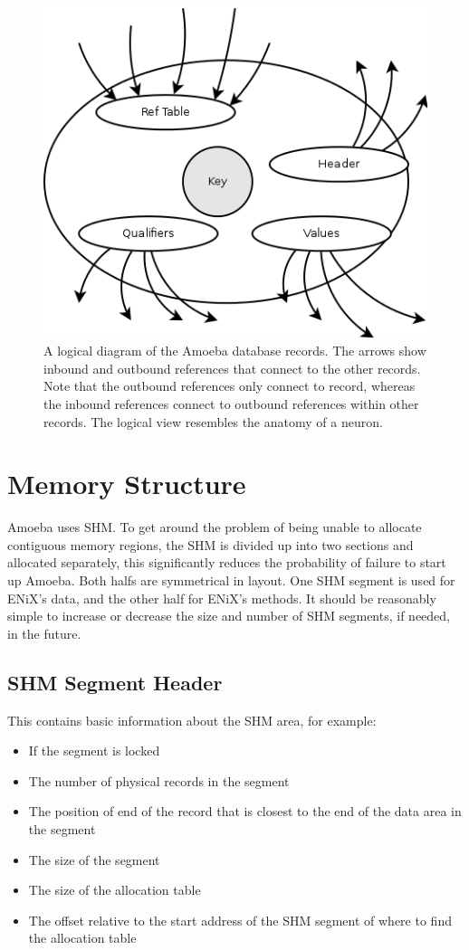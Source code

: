 \documentclass[11pt]{article}
\begin{document}
\begin{figure}[ht]
\centering
\includegraphics[scale=0.4]{AmoebaRecordStructure2.png}
\caption{A logical diagram of the Amoeba database records. The arrows show inbound and outbound references that connect to the other records. Note that the outbound references only connect to record, whereas the inbound references connect to outbound references within other records. The logical view resembles the anatomy of a neuron.}
\end{figure}
\newpage
\noindent
\section{Memory Structure}
Amoeba uses SHM. To get around the problem of being unable to allocate contiguous memory regions, the SHM is divided up into two sections and allocated separately, this significantly reduces the probability of failure to start up Amoeba. Both halfs are symmetrical in layout. One SHM segment is used for ENiX's data, and the other half for ENiX's methods. It should be reasonably simple to increase or decrease the size and number of SHM segments, if needed, in the future.
\subsection{SHM Segment Header}
This contains basic information about the SHM area, for example:
\begin{itemize}
\item If the segment is locked
\item The number of physical records in the segment
\item The position of end of the record that is closest to the end of the data area in the segment
\item The size of the segment
\item The size of the allocation table
\item The offset relative to the start address of the SHM segment of where to find the allocation table
\end{itemize}
\end{document}
